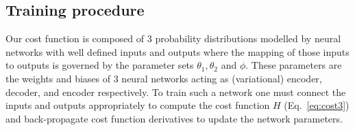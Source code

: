 \documentclass[%
showpacs,
nofootinbib,
 amsmath,amssymb,
 aps,
 twocolumn,
 prl,
 reprint,
floatfix,
]{revtex4-1}
\begin{document}
\subsection{Training procedure}\label{app:training_procedure}
%
%
Our cost function is composed of 3 probability distributions modelled by
neural networks with well defined inputs and outputs where the mapping of
those inputs to outputs is governed by the parameter sets
$\theta_{1},\theta_{2}$ and $\phi$. These parameters are the weights and biases
of 3 neural networks acting as (variational) encoder, decoder, and encoder
respectively. To train such a network one must connect the inputs and outputs
appropriately to compute the cost function $H$ (Eq.~\ref{eq:cost3}) and
back-propagate cost function derivatives to update the network parameters. 
\end{document}
